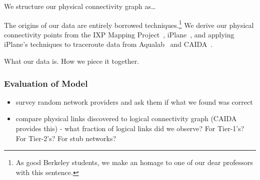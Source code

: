     We structure our physical connectivity graph as\ldots

    The origins of our data are entirely borrowed techniques.\footnote{As good Berkeley students, we make an homage to one of our dear professors with this sentence.}
    We derive our physical connectivity points from the IXP Mapping Project~\cite{ixps-mapped}, iPlane~\cite{iplane}, and applying iPlane's techniques to traceroute data from Aqualab~\cite{sidewalk} and CAIDA~\cite{caidadata}.

        What our data is.
        How we piece it together.
        \subsubsection*{Evaluation of Model}
            \begin{itemize}
        \item survey random network providers and ask them if what we
        found was correct
        \item compare physical links discovered to logical connectivity
        graph (CAIDA provides this) - what fraction of logical links
        did we observe? For Tier-1's? For Tier-2's? For stub networks?
            \end{itemize} 


